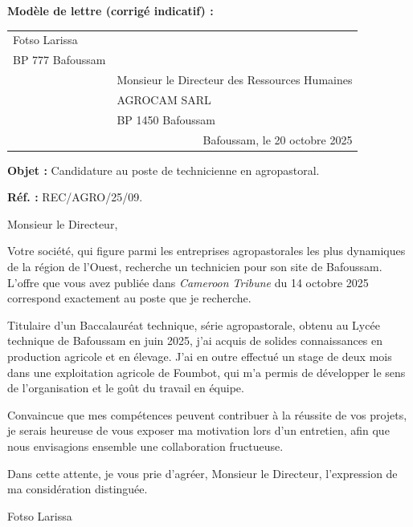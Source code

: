 \documentclass[11pt]{article}
\begin{document}
\begin{corrige}
\textbf{Modèle de lettre (corrigé indicatif) :}

\begin{center}
\begin{tabularx}{\linewidth}{X X}
Fotso Larissa & \\
BP 777 Bafoussam & \\
& Monsieur le Directeur des Ressources Humaines\\
& AGROCAM SARL\\
& BP 1450 Bafoussam\\
\multicolumn{2}{r}{Bafoussam, le 20 octobre 2025}\\
\end{tabularx}
\end{center}

\textbf{Objet :} Candidature au poste de technicienne en agropastoral.

\textbf{Réf. :} REC/AGRO/25/09.

Monsieur le Directeur,

Votre société, qui figure parmi les entreprises agropastorales les plus dynamiques de la région de l'Ouest, recherche un technicien pour son site de Bafoussam. L'offre que vous avez publiée dans \emph{Cameroon Tribune} du 14 octobre 2025 correspond exactement au poste que je recherche.

Titulaire d'un Baccalauréat technique, série agropastorale, obtenu au Lycée technique de Bafoussam en juin 2025, j'ai acquis de solides connaissances en production agricole et en élevage. J'ai en outre effectué un stage de deux mois dans une exploitation agricole de Foumbot, qui m'a permis de développer le sens de l'organisation et le goût du travail en équipe.

Convaincue que mes compétences peuvent contribuer à la réussite de vos projets, je serais heureuse de vous exposer ma motivation lors d'un entretien, afin que nous envisagions ensemble une collaboration fructueuse.

Dans cette attente, je vous prie d'agréer, Monsieur le Directeur, l'expression de ma considération distinguée.

Fotso Larissa


\end{corrige}
\end{document}
